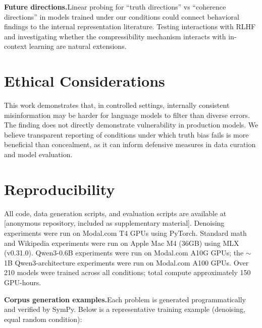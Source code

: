 \documentclass{article}
\begin{document}
\textbf{Future directions.}\quad Linear probing for ``truth directions'' vs ``coherence directions'' in models trained under our conditions could connect behavioral findings to the internal representation literature. Testing interactions with RLHF and investigating whether the compressibility mechanism interacts with in-context learning are natural extensions.

\section*{Ethical Considerations}

This work demonstrates that, in controlled settings, internally consistent misinformation may be harder for language models to filter than diverse errors. The finding does not directly demonstrate vulnerability in production models. We believe transparent reporting of conditions under which truth bias fails is more beneficial than concealment, as it can inform defensive measures in data curation and model evaluation.




\appendix

\section{Reproducibility}
\label{app:reproducibility}

All code, data generation scripts, and evaluation scripts are available at [anonymous repository, included as supplementary material]. Denoising experiments were run on Modal.com T4 GPUs using PyTorch. Standard math and Wikipedia experiments were run on Apple Mac M4 (36GB) using MLX (v0.31.0). Qwen3-0.6B experiments were run on Modal.com A10G GPUs; the ${\sim}$1B Qwen3-architecture experiments were run on Modal.com A100 GPUs. Over 210 models were trained across all conditions; total compute approximately 150 GPU-hours.

\textbf{Corpus generation examples.}\quad Each problem is generated programmatically and verified by SymPy. Below is a representative training example (denoising, equal random condition):
\end{document}
